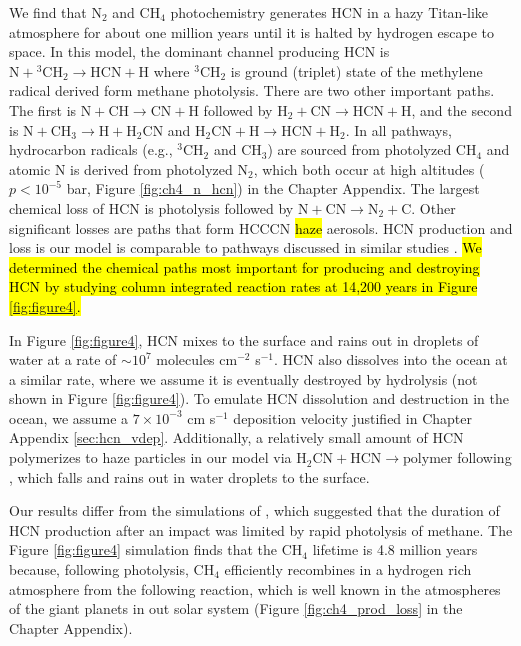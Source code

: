 We find that N$_2$ and CH$_4$ photochemistry generates HCN in a hazy Titan-like atmosphere for about one million years until it is halted by hydrogen escape to space. In this model, the dominant channel producing HCN is $\mathrm{N} + \mathrm{^3CH_2} \rightarrow \mathrm{HCN} + \mathrm{H}$ where $\mathrm{^3CH_2}$ is ground (triplet) state of the methylene radical derived form methane photolysis. There are two other important paths. The first is $\mathrm{N} + \mathrm{CH} \rightarrow \mathrm{CN} + \mathrm{H}$ followed by $\mathrm{H_2} + \mathrm{CN} \rightarrow \mathrm{HCN} + \mathrm{H}$, and the second is $\mathrm{N} + \mathrm{CH_3} \rightarrow \mathrm{H} + \mathrm{H_2CN}$ and $\mathrm{H_2CN} + \mathrm{H} \rightarrow \mathrm{HCN} + \mathrm{H_2}$. In all pathways, hydrocarbon radicals (e.g., $\mathrm{^3CH_2}$ and $\mathrm{CH_3}$) are sourced from photolyzed CH$_4$ and atomic N is derived from photolyzed N$_2$, which both occur at high altitudes ($p < 10^{-5}$ bar, Figure \ref{fig:ch4_n_hcn}) in the Chapter Appendix. The largest chemical loss of HCN is photolysis followed by $\mathrm{N} + \mathrm{CN} \rightarrow \mathrm{N_2} + \mathrm{C}$. Other significant losses are paths that form HCCCN \hl{haze} aerosols. HCN production and loss is our model is comparable to pathways discussed in similar studies \citep{Zahnle_1986,Tian_2011,Rimmer_2019}. \hl{We determined the chemical paths most important for producing and destroying HCN by studying column integrated reaction rates at 14,200 years in Figure \mbox{\ref{fig:figure4}}.}

In Figure \ref{fig:figure4}, HCN mixes to the surface and rains out in droplets of water at a rate of $\sim 10^7$ molecules cm$^{-2}$ s$^{-1}$. HCN also dissolves into the ocean at a similar rate, where we assume it is eventually destroyed by hydrolysis (not shown in Figure \ref{fig:figure4}). To emulate HCN dissolution and destruction in the ocean, we assume a $7 \times 10^{-3}$ cm s$^{-1}$ deposition velocity justified in Chapter Appendix \ref{sec:hcn_vdep}. Additionally, a relatively small amount of HCN polymerizes to haze particles in our model via $\mathrm{H_2CN} + \mathrm{HCN} \rightarrow \mathrm{polymer}$ following \citet{Lavvas_2008}, which falls and rains out in water droplets to the surface.

Our results differ from the simulations of \citet{Zahnle_2020}, which suggested that the duration of HCN production after an impact was limited by rapid photolysis of methane. The Figure \ref{fig:figure4} simulation finds that the CH$_4$ lifetime is 4.8 million years because, following photolysis, CH$_4$ efficiently recombines in a hydrogen rich atmosphere from the following reaction, which is well known in the atmospheres of the giant planets in out solar system (Figure \ref{fig:ch4_prod_loss} in the Chapter Appendix).

